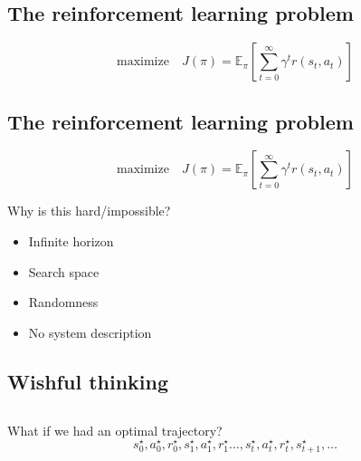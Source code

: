 \documentclass[
  letterpaper,
  DIV=11,
  numbers=noendperiod,
  oneside]{scrartcl}
\providecommand{\tightlist}{%
  \setlength{\itemsep}{0pt}\setlength{\parskip}{0pt}}\usepackage{longtable,booktabs,array}
\begin{document}
\subsection{The reinforcement learning
problem}\label{the-reinforcement-learning-problem}

\[ \text{maximize} \quad J(\pi) = \mathbb{E}_{\pi}\left[ \sum_{t=0}^{\infty} \gamma^{t}r(s_t,a_t) \right]\]

\subsection{The reinforcement learning
problem}\label{the-reinforcement-learning-problem-1}

\[ \text{maximize} \quad J(\pi) = \mathbb{E}_{\pi}\left[ \sum_{t=0}^{\infty} \gamma^{t}r(s_t,a_t) \right]\]

Why is this hard/impossible?

\begin{itemize}
\tightlist
\item
  Infinite horizon
\item
  Search space
\item
  Randomness
\item
  No system description
\end{itemize}

\subsection{Wishful thinking}\label{wishful-thinking}

\subsection{}\label{section-5}

What if we had an optimal trajectory?
\[s_0^\star, a_0^\star, r_0^\star, s_1^\star, a_1^\star, r_1^\star \ldots, s_{t}^\star, a_{t}^\star, r_{t}^\star, s_{t+1}^\star, \ldots\]
\end{document}
